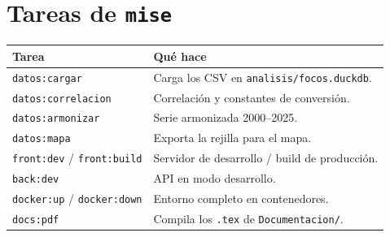 \section{Tareas de \texttt{mise}}

\begin{tabularx}{\linewidth}{@{}lX@{}}
\toprule
Tarea & Qué hace \\
\midrule
\texttt{datos:cargar} & Carga los CSV en \texttt{analisis/focos.duckdb}. \\
\texttt{datos:correlacion} & Correlación y constantes de conversión. \\
\texttt{datos:armonizar} & Serie armonizada 2000--2025. \\
\texttt{datos:mapa} & Exporta la rejilla para el mapa. \\
\texttt{front:dev} / \texttt{front:build} & Servidor de desarrollo / build de producción. \\
\texttt{back:dev} & API en modo desarrollo. \\
\texttt{docker:up} / \texttt{docker:down} & Entorno completo en contenedores. \\
\texttt{docs:pdf} & Compila los \texttt{.tex} de \texttt{Documentacion/}. \\
\bottomrule
\end{tabularx}
